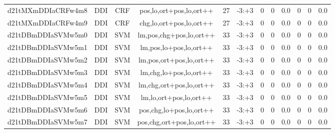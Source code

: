 \documentclass[a4paper]{article}
\begin{document}
\begin{landscape}
\begin{center}
\begin{tabular}{ |c|c|c|c|c|c|c|c|c|c|c|c|}
 
 	
 	\small{ d21tMXmDDIaCRFw4m8 } & \small{ DDI} & \small{  CRF }  & pos,lo,ort+pos,lo,ort++  &  27 &  \small{  -3:+3 }  &  0 & 0 & 0.0  &  0 & 0 & 0.0 \\
 	

 
 	
 	\small{ d21tMXmDDIaCRFw4m9 } & \small{ DDI} & \small{  CRF }  & chg,lo,ort+pos,lo,ort++  &  27 &  \small{  -3:+3 }  &  0 & 0 & 0.0  &  0 & 0 & 0.0 \\
 	

 
 	
 	\small{ d21tDBmDDIaSVMw5m0 } & \small{ DDI} & \small{  SVM }  & lm,pos,chg+pos,lo,ort++  &  33 &  \small{  -3:+3 }  &  0 & 0 & 0.0  &  0 & 0 & 0.0 \\
 	

 
 	
 	\small{ d21tDBmDDIaSVMw5m1 } & \small{ DDI} & \small{  SVM }  & lm,pos,lo+pos,lo,ort++  &  33 &  \small{  -3:+3 }  &  0 & 0 & 0.0  &  0 & 0 & 0.0 \\
 	

 
 	
 	\small{ d21tDBmDDIaSVMw5m2 } & \small{ DDI} & \small{  SVM }  & lm,pos,ort+pos,lo,ort++  &  33 &  \small{  -3:+3 }  &  0 & 0 & 0.0  &  0 & 0 & 0.0 \\
 	

 
 	
 	\small{ d21tDBmDDIaSVMw5m3 } & \small{ DDI} & \small{  SVM }  & lm,chg,lo+pos,lo,ort++  &  33 &  \small{  -3:+3 }  &  0 & 0 & 0.0  &  0 & 0 & 0.0 \\
 	

 
 	
 	\small{ d21tDBmDDIaSVMw5m4 } & \small{ DDI} & \small{  SVM }  & lm,chg,ort+pos,lo,ort++  &  33 &  \small{  -3:+3 }  &  0 & 0 & 0.0  &  0 & 0 & 0.0 \\
 	

 
 	
 	\small{ d21tDBmDDIaSVMw5m5 } & \small{ DDI} & \small{  SVM }  & lm,lo,ort+pos,lo,ort++  &  33 &  \small{  -3:+3 }  &  0 & 0 & 0.0  &  0 & 0 & 0.0 \\
 	

 
 	
 	\small{ d21tDBmDDIaSVMw5m6 } & \small{ DDI} & \small{  SVM }  & pos,chg,lo+pos,lo,ort++  &  33 &  \small{  -3:+3 }  &  0 & 0 & 0.0  &  0 & 0 & 0.0 \\
 	

 
 	
 	\small{ d21tDBmDDIaSVMw5m7 } & \small{ DDI} & \small{  SVM }  & pos,chg,ort+pos,lo,ort++  &  33 &  \small{  -3:+3 }  &  0 & 0 & 0.0  &  0 & 0 & 0.0 \\
 	


\end{tabular}
\end{center}
\end{landscape}
\end{document}
